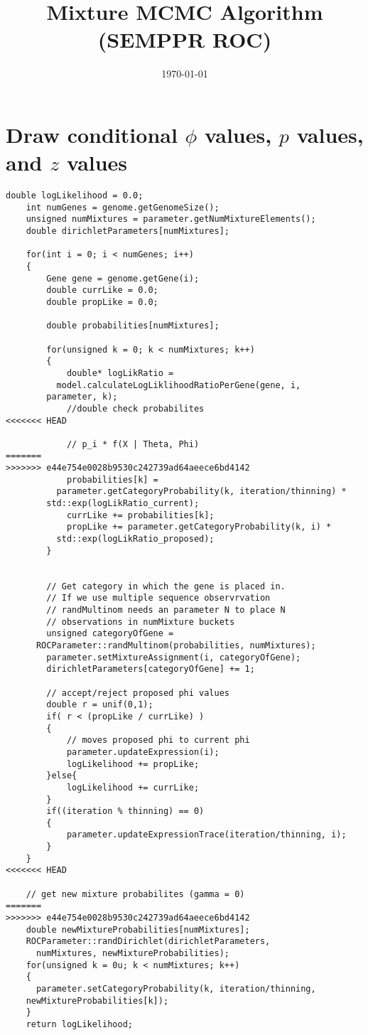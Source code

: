 \documentclass[11pt]{article}
\begin{document}
  \title{Mixture MCMC Algorithm (SEMPPR ROC)}
  \date{\today}
  \maketitle
  
  \section{Draw conditional $\phi$ values, $p$ values, and $z$ values}
  
  \begin{lstlisting}[frame=single]
    double logLikelihood = 0.0;
    int numGenes = genome.getGenomeSize();
    unsigned numMixtures = parameter.getNumMixtureElements();
    double dirichletParameters[numMixtures];
    
    for(int i = 0; i < numGenes; i++)
    {
        Gene gene = genome.getGene(i);
        double currLike = 0.0;
        double propLike = 0.0;

        double probabilities[numMixtures];

        for(unsigned k = 0; k < numMixtures; k++)
        {
            double* logLikRatio = 
	      model.calculateLogLiklihoodRatioPerGene(gene, i, 
		parameter, k);
            //double check probabilites
<<<<<<< HEAD
            
            // p_i * f(X | Theta, Phi)
=======
>>>>>>> e44e754e0028b9530c242739ad64aeece6bd4142
            probabilities[k] = 
	      parameter.getCategoryProbability(k, iteration/thinning) * 
		std::exp(logLikRatio_current);
            currLike += probabilities[k];
            propLike += parameter.getCategoryProbability(k, i) * 
	      std::exp(logLikRatio_proposed);
        }


        // Get category in which the gene is placed in.
        // If we use multiple sequence observrvation 
        // randMultinom needs an parameter N to place N 
        // observations in numMixture buckets
        unsigned categoryOfGene = 
	  ROCParameter::randMultinom(probabilities, numMixtures);
        parameter.setMixtureAssignment(i, categoryOfGene);
        dirichletParameters[categoryOfGene] += 1;

        // accept/reject proposed phi values
        double r = unif(0,1);
        if( r < (propLike / currLike) )
        {
            // moves proposed phi to current phi
            parameter.updateExpression(i);
            logLikelihood += propLike;
        }else{
            logLikelihood += currLike;
        }
        if((iteration % thinning) == 0)
        {
            parameter.updateExpressionTrace(iteration/thinning, i);
        }
    }
<<<<<<< HEAD
    
    // get new mixture probabilites (gamma = 0)
=======
>>>>>>> e44e754e0028b9530c242739ad64aeece6bd4142
    double newMixtureProbabilities[numMixtures];
    ROCParameter::randDirichlet(dirichletParameters, 
      numMixtures, newMixtureProbabilities);
    for(unsigned k = 0u; k < numMixtures; k++)
    {
      parameter.setCategoryProbability(k, iteration/thinning, 
	newMixtureProbabilities[k]);
    }
    return logLikelihood;
  \end{lstlisting}
\end{document}
